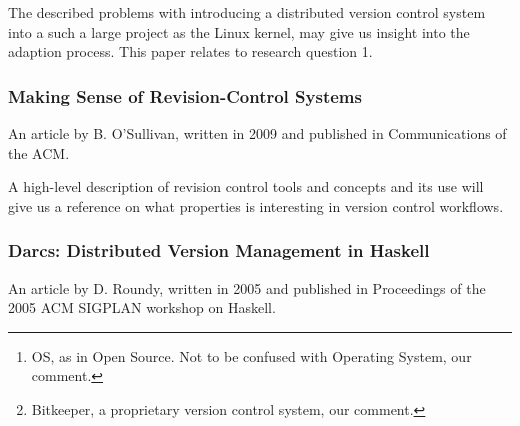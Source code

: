 \documentclass{llncs}
\begin{document}
\begin{abstract}
 Version management tools might be seen as a prerequisite for open
 source development today as projects become too large to be managed by
 maintainers alone. Yet the OS\footnote{ 
  OS, as in Open Source. Not to be confused with Operating System, our 
  comment.
 } process depends on fluid coordination and collaboration with the
 underlying qualities of this process based on firm trust and
 respect for fellow developers. This paper is a study of how
 debate over version tools reflects governance and decision making
 in an OS community. The paper is based on a study of the Linux kernel
 community as it first saw a partial acceptance of the CVS tool, and then
 later adopted BK\footnote{
  Bitkeeper, a proprietary version control system, our comment. 
 }. The paper explains the adoption process in relation to governance
 concerns, license issues, and questions of technical performance.
\end{abstract}

The described problems with introducing a distributed version control
system into a such a large project as the Linux kernel, may give us
insight into the adaption process. This paper relates to research
question 1.

\subsubsection{Making Sense of Revision-Control Systems}

An article by B. O'Sullivan, written in 2009 and published in
Communications of the ACM.

\begin{abstract}
 All revision-control systems come with complicated sets of trade-offs. How
 do you find the best match between tool and team?
\end{abstract}

A high-level description of revision control tools and concepts and its use
will give us a reference on what properties is interesting in version
control workflows.

\subsubsection{Darcs: Distributed Version Management in Haskell}

An article by D. Roundy, written in 2005 and published in Proceedings of the
2005 ACM SIGPLAN workshop on Haskell.
\end{document}
